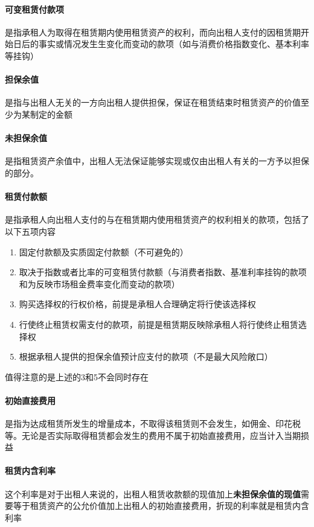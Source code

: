\documentclass[UTF8,12pt]{ctexart}
\numberwithin{equation}{section} %
\numberwithin{figure}{section}
\numberwithin{table}{section}
\begin{document}
	\paragraph{可变租赁付款项}是指承租人为取得在租赁期内使用租赁资产的权利，而向出租人支付的因租赁期开始日后的事实或情况发生生变化而变动的款项（如与消费价格指数变化、基本利率等挂钩）
	
	\paragraph{担保余值}是指与出租人无关的一方向出租人提供担保，保证在租赁结束时租赁资产的价值至少为某制定的金额
	
	\paragraph{未担保余值}是指租赁资产余值中，出租人无法保证能够实现或仅由出租人有关的一方予以担保的部分。
	
	\paragraph{租赁付款额}是指承租人向出租人支付的与在租赁期内使用租赁资产的权利相关的款项，包括了以下五项内容
	\begin{enumerate}
		\item 固定付款额及实质固定付款额（不可避免的）
		
		\item 取决于指数或者比率的可变租赁付款额（与消费者指数、基准利率挂钩的款项和为反映市场租金费率变化而变动的款项）
		
		\item 购买选择权的行权价格，前提是承租人合理确定将行使该选择权
		
		\item 行使终止租赁权需支付的款项，前提是租赁期反映除承租人将行使终止租赁选择权
		
		\item 根据承租人提供的担保余值预计应支付的款项（不是最大风险敞口）
	\end{enumerate}
	值得注意的是上述的3和5不会同时存在
	
	\paragraph{初始直接费用}是指为达成租赁所发生的增量成本，不取得该租赁则不会发生，如佣金、印花税等。无论是否实际取得租赁都会发生的费用不属于初始直接费用，应当计入当期损益
	
	\paragraph{租赁内含利率}这个利率是对于出租人来说的，出租人租赁收款额的现值加上\textbf{未担保余值的现值}需要等于租赁资产的公允价值加上出租人的初始直接费用，折现的利率就是租赁内含利率
	
\end{document}
